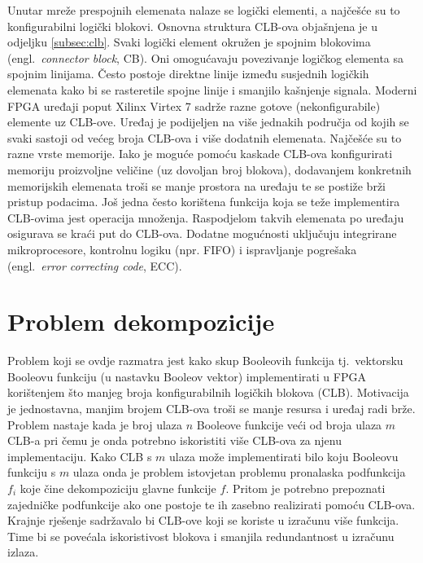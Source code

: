 \documentclass[times, utf8, diplomski]{fer}
\begin{document}
Unutar mreže prespojnih elemenata nalaze se logički elementi, a najčešće su to konfigurabilni logički blokovi. Osnovna struktura CLB-ova objašnjena je u odjeljku \ref{subsec:clb}. Svaki logički element okružen je spojnim blokovima (engl.~\textit{connector block}, CB). Oni omogućavaju povezivanje logičkog elementa sa spojnim linijama. Često postoje direktne linije između susjednih logičkih elemenata kako bi se rasteretile spojne linije i smanjilo kašnjenje signala. Moderni FPGA uređaji poput Xilinx Virtex 7 sadrže razne gotove (nekonfigurabile) elemente uz CLB-ove. Uređaj je podijeljen na više jednakih područja od kojih se svaki sastoji od većeg broja CLB-ova i više dodatnih elemenata. Najčešće su to razne vrste memorije. Iako je moguće pomoću kaskade CLB-ova konfigurirati memoriju proizvoljne veličine (uz dovoljan broj blokova), dodavanjem konkretnih memorijskih elemenata troši se manje prostora na uređaju te se postiže brži pristup podacima. Još jedna često korištena funkcija koja se teže implementira CLB-ovima jest operacija množenja. Raspodjelom takvih elemenata po uređaju osigurava se kraći put do CLB-ova. Dodatne mogućnosti uključuju integrirane mikroprocesore, kontrolnu logiku (npr. FIFO) i ispravljanje pogrešaka (engl.~\textit{error correcting code}, ECC).


\section{Problem dekompozicije} \label{sec:decomposition}

Problem koji se ovdje razmatra jest kako skup Booleovih funkcija tj.~vektorsku Booleovu funkciju (u nastavku Booleov vektor) implementirati u FPGA korištenjem što manjeg broja konfigurabilnih logičkih blokova (CLB). Motivacija je jednostavna, manjim brojem CLB-ova troši se manje resursa i uređaj radi brže. Problem nastaje kada je broj ulaza $n$ Booleove funkcije veći od broja ulaza $m$ CLB-a pri čemu je onda potrebno iskoristiti više CLB-ova za njenu implementaciju. Kako CLB s $m$ ulaza može implementirati bilo koju Booleovu funkciju s $m$ ulaza onda je problem istovjetan problemu pronalaska podfunkcija $f_{i}$ koje čine dekompoziciju glavne funkcije $f$. Pritom je potrebno prepoznati zajedničke podfunkcije ako one postoje te ih zasebno realizirati pomoću CLB-ova. Krajnje rješenje sadržavalo bi CLB-ove koji se koriste u izračunu više funkcija. Time bi se povećala iskoristivost blokova i smanjila redundantnost u izračunu izlaza.
\end{document}
